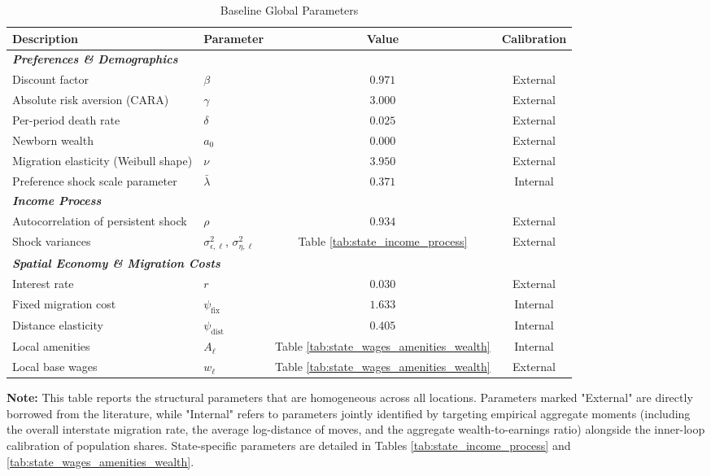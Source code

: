 \begin{table}[!htb]
    \centering
    \caption{Baseline Global Parameters}
    \label{tab:baseline_params}
    \begin{tabular}{llcc}
        \toprule
        \textbf{Description} & \textbf{Parameter} & \textbf{Value} & \textbf{Calibration} \\
        \midrule
        \multicolumn{4}{l}{\textbf{\textit{Preferences \& Demographics}}} \\
        Discount factor & $\beta$ & $0.971$ & External \\
        Absolute risk aversion (CARA) & $\gamma$ & $3.000$ & External \\
        Per-period death rate & $\delta$ & $0.025$ & External \\ 
        Newborn wealth & $a_0$ & $0.000$ & External \\
        Migration elasticity (Weibull shape) & $\nu$ & $3.950$ & External \\
        Preference shock scale parameter & $\bar{\lambda}$ & $0.371$ & Internal \\
        \midrule
        \multicolumn{4}{l}{\textbf{\textit{Income Process}}} \\
        Autocorrelation of persistent shock & $\rho$ & $0.934$ & External \\
        Shock variances & $\sigma_{\epsilon,\ell}^2$, $\sigma_{\eta,\ell}^2$ & Table \ref{tab:state_income_process} & External \\
        \midrule
        \multicolumn{4}{l}{\textbf{\textit{Spatial Economy \& Migration Costs}}} \\
        Interest rate & $r$ & $0.030$ & External \\
        Fixed migration cost & $\psi_{\text{fix}}$ & $1.633$ & Internal \\
        Distance elasticity & $\psi_{\text{dist}}$ & $0.405$ & Internal \\
        Local amenities & $A_\ell$ & Table \ref{tab:state_wages_amenities_wealth} & Internal \\
        Local base wages & $w_\ell$ & Table \ref{tab:state_wages_amenities_wealth} & External \\
        \bottomrule
    \end{tabular}
    
    \vspace{0.2cm}
    \begin{minipage}{0.9\textwidth}
        \small \textbf{Note:} This table reports the structural parameters that are homogeneous across all locations. Parameters marked "External" are directly borrowed from the literature, while "Internal" refers to parameters jointly identified by targeting empirical aggregate moments (including the overall interstate migration rate, the average log-distance of moves, and the aggregate wealth-to-earnings ratio) alongside the inner-loop calibration of population shares. State-specific parameters are detailed in Tables \ref{tab:state_income_process} and \ref{tab:state_wages_amenities_wealth}.
    \end{minipage}
\end{table}